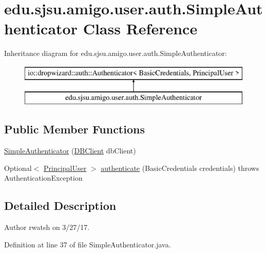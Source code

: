 \hypertarget{classedu_1_1sjsu_1_1amigo_1_1user_1_1auth_1_1_simple_authenticator}{}\section{edu.\+sjsu.\+amigo.\+user.\+auth.\+Simple\+Authenticator Class Reference}
\label{classedu_1_1sjsu_1_1amigo_1_1user_1_1auth_1_1_simple_authenticator}
Inheritance diagram for edu.\+sjsu.\+amigo.\+user.\+auth.\+Simple\+Authenticator\+:\begin{figure}[H]
\begin{center}
\leavevmode
\includegraphics[height=2.000000cm]{classedu_1_1sjsu_1_1amigo_1_1user_1_1auth_1_1_simple_authenticator}
\end{center}
\end{figure}
\subsection*{Public Member Functions}
\begin{DoxyCompactItemize}
\item 
\hyperlink{classedu_1_1sjsu_1_1amigo_1_1user_1_1auth_1_1_simple_authenticator_aa6b33eb4a21d5e0f6ba6f887717c0285}{Simple\+Authenticator} (\hyperlink{interfaceedu_1_1sjsu_1_1amigo_1_1db_1_1common_1_1_d_b_client}{D\+B\+Client} db\+Client)
\item 
Optional$<$ \hyperlink{classedu_1_1sjsu_1_1amigo_1_1user_1_1auth_1_1_principal_user}{Principal\+User} $>$ \hyperlink{classedu_1_1sjsu_1_1amigo_1_1user_1_1auth_1_1_simple_authenticator_a71aeb46d748e73835e36bfa8c8a6a78a}{authenticate} (Basic\+Credentials credentials)  throws Authentication\+Exception 
\end{DoxyCompactItemize}


\subsection{Detailed Description}
\begin{DoxyAuthor}{Author}
rwatsh on 3/27/17. 
\end{DoxyAuthor}


Definition at line 37 of file Simple\+Authenticator.\+java.



